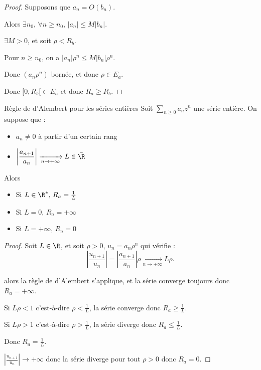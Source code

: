 
\begin{proof}
    Supposons que $a_n = O(b_n)$. 

    Alors $\exists n_0, \, \forall n \geqslant n_0, \, |a_n| \leqslant M |b_n|$.

    $\exists M > 0$, et soit $\rho < R_b$. 

    Pour $n \geqslant n_0$, on a $|a_n| \rho^n \leqslant M |b_n| \rho^n$.

    Donc $(a_n \rho^n)$ bornée, et donc $\rho \in E_a$.

    Donc $[0, R_b[ \subset E_a$ et donc $R_a \geqslant R_b$.
\end{proof}



\begin{theoreme}{Règle de d'Alembert pour les séries entières}{}
    Soit $\sum_{n \geqslant 0} a_n z^n$ une série entière. On suppose que : 
    \begin{itemize}
        \item $a_n \neq 0$ à partir d'un certain rang
        \item $\displaystyle \left| \frac{a_{n + 1 }}{a_n } \right| \xrightarrow[n \to + \infty   ]{} L \in \bar{\R}$ 
    \end{itemize}

    Alors 
    \begin{itemize}
        \item Si $L \in \R^*, \, R_a = \frac 1 L$
        \item Si $L = 0, \, R_a = +\infty$
        \item Si $L = +\infty, \, R_a = 0$
    \end{itemize}
\end{theoreme}


\begin{proof}
    Soit $L \in \R$, et soit $\rho > 0$, $u_n = a_n \rho^n$ qui vérifie :
    \[
        \left| \frac{u_{n + 1}}{u_n} \right| = \left| \frac{a_{n + 1}}{a_n} \right| \rho \xrightarrow[n \to + \infty ]{} L \rho.
    \]

     alors la règle de d'Alembert s'applique, et la série converge toujours 
    donc $R_a = +\infty$.

    
    \avspace Si $L \rho < 1$ c'est-à-dire $\rho < \frac 1 L$, la série converge donc $R_a \geqslant \frac 1 L$.

    Si $L \rho > 1$ c'est-à-dire $\rho > \frac 1 L$, la série diverge donc $R_a \leqslant \frac 1 L$.

    Donc $R_a = \frac 1 L$.


    \avspace $\displaystyle \left| \frac{u_{n + 1}}{u_n } \right| \to + \infty$ donc la série diverge 
    pour tout $\rho > 0$ donc $R_a = 0$.
\end{proof}

